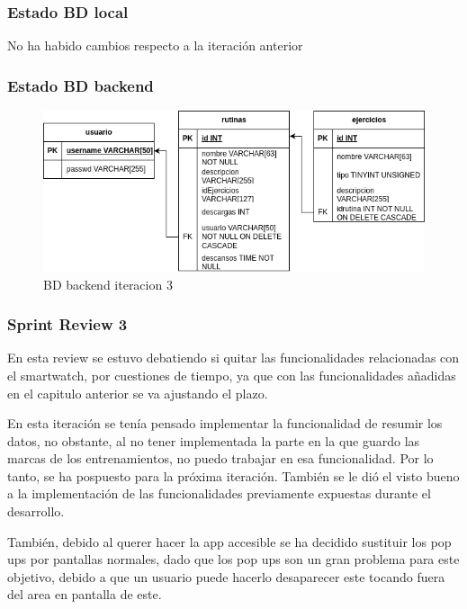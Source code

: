 \subsubsection{Estado BD local}

No ha habido cambios respecto a la iteración anterior

\subsubsection{Estado BD backend}

\begin{figure}[H]
   \centering
    \includegraphics[width=\textwidth]{fotos/BD be iteracion 3.png}
    \caption{BD backend iteracion 3}
    \label{fig:BD be iteracion 3}
\end{figure}

\subsubsection{Sprint Review 3}

En esta review se estuvo debatiendo si quitar las funcionalidades relacionadas con el smartwatch, por cuestiones de tiempo, ya que con las funcionalidades añadidas en el capitulo anterior se va ajustando el plazo.

En esta iteración se tenía pensado implementar la funcionalidad de resumir los datos, no obstante, al no tener implementada la parte en la que guardo las marcas de los entrenamientos, no puedo trabajar en esa funcionalidad. Por lo tanto, se ha pospuesto para la próxima iteración. También se le dió el visto bueno a la implementación de las funcionalidades previamente expuestas durante el desarrollo.

También, debido al querer hacer la app accesible se ha decidido sustituir los pop ups por pantallas normales, dado que los pop ups son un gran problema para este objetivo, debido a que un usuario puede hacerlo desaparecer este tocando fuera del area en pantalla de este.


